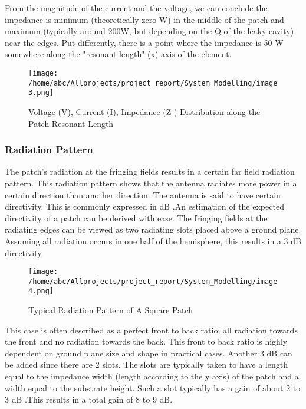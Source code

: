 \documentclass[12pt]{article}
\begin{document}
         
	 \justify
      From the magnitude of the current and the voltage, we can conclude the impedance is minimum (theoretically zero W) in the middle of the patch and maximum (typically around 200W, but depending on the Q of the leaky cavity) near the edges. Put differently, there is a point where the impedance is 50 W somewhere along the "resonant length" (x) axis of the element.
      
        \begin{figure}[H]
         	\centering
           	\texttt{[image: /home/abc/Allprojects/project\_report/System\_Modelling/image3.png]}
           	\caption{Voltage (V), Current (I), Impedance (Z ) Distribution along the Patch Resonant Length}
         \end{figure}
      
      

      \subsubsection{Radiation Pattern}
       \justify
        The patch's radiation at the fringing fields results in a certain far field radiation pattern. This radiation pattern shows that the antenna radiates more power in a certain direction than another direction. The antenna is said to have certain directivity. This is commonly expressed in dB .An estimation of the expected directivity of a patch can be derived with ease. The fringing fields at the radiating edges can be viewed as two radiating slots placed above a ground plane. Assuming all radiation occurs in one half of the hemisphere, this results in a 3 dB directivity. 
        
        
        \begin{figure}[H]
        	\centering
        	\texttt{[image: /home/abc/Allprojects/project\_report/System\_Modelling/image4.png]}
        	\caption{Typical Radiation Pattern of A Square Patch}
        \end{figure}
           
        This case is often described as a perfect front to back ratio; all radiation towards the front and no radiation towards the back. This front to back ratio is highly dependent on ground plane size and shape in practical cases. Another 3 dB can be added since there are 2 slots. The slots are typically taken to have a length equal to the impedance width (length according to the y axis) of the patch and a width equal to the substrate height. Such a slot typically has a gain of about 2 to 3 dB .This results in a total gain of 8 to 9 dB.
        
\end{document}
